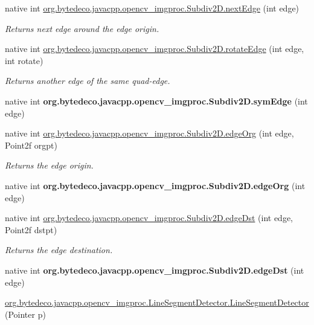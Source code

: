 \begin{DoxyCompactItemize}
native int \hyperlink{group__imgproc_ga38e3ebcc5d8682369388dd02acaa43a6}{org.\+bytedeco.\+javacpp.\+opencv\+\_\+imgproc.\+Subdiv2\+D.\+next\+Edge} (int edge)
\begin{DoxyCompactList}\small\item\em Returns next edge around the edge origin. \end{DoxyCompactList}\item 
native int \hyperlink{group__imgproc_gabfc2f5bafd97c684939d0d74ee719f70}{org.\+bytedeco.\+javacpp.\+opencv\+\_\+imgproc.\+Subdiv2\+D.\+rotate\+Edge} (int edge, int rotate)
\begin{DoxyCompactList}\small\item\em Returns another edge of the same quad-\/edge. \end{DoxyCompactList}\item 
\mbox{\label{group__imgproc_ga522580894a4d22ee75de4c8f4f6eb051}} 
native int {\bfseries org.\+bytedeco.\+javacpp.\+opencv\+\_\+imgproc.\+Subdiv2\+D.\+sym\+Edge} (int edge)
\item 
native int \hyperlink{group__imgproc_gac70cf2d7562d68ab618249b422182e99}{org.\+bytedeco.\+javacpp.\+opencv\+\_\+imgproc.\+Subdiv2\+D.\+edge\+Org} (int edge, Point2f orgpt)
\begin{DoxyCompactList}\small\item\em Returns the edge origin. \end{DoxyCompactList}\item 
\mbox{\label{group__imgproc_gadd010a908a321aa4d5d72fc256da118e}} 
native int {\bfseries org.\+bytedeco.\+javacpp.\+opencv\+\_\+imgproc.\+Subdiv2\+D.\+edge\+Org} (int edge)
\item 
native int \hyperlink{group__imgproc_gad2814006051bf55fa95077d3578347fb}{org.\+bytedeco.\+javacpp.\+opencv\+\_\+imgproc.\+Subdiv2\+D.\+edge\+Dst} (int edge, Point2f dstpt)
\begin{DoxyCompactList}\small\item\em Returns the edge destination. \end{DoxyCompactList}\item 
\mbox{\label{group__imgproc_gad5bb2928dabde6a8ec05955b50560f31}} 
native int {\bfseries org.\+bytedeco.\+javacpp.\+opencv\+\_\+imgproc.\+Subdiv2\+D.\+edge\+Dst} (int edge)
\item 
\hyperlink{group__imgproc_gaf6bdbba75ec1ba94f3775caa208c7d94}{org.\+bytedeco.\+javacpp.\+opencv\+\_\+imgproc.\+Line\+Segment\+Detector.\+Line\+Segment\+Detector} (Pointer p)

\end{DoxyCompactItemize}
